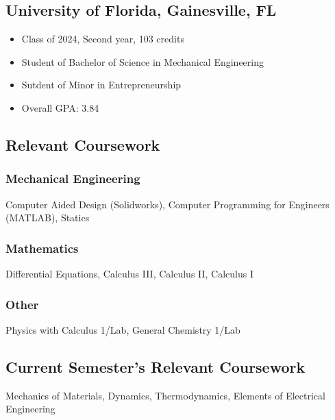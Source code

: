\documentclass{article}
\newcommand\halftextbox[1]{%
  \parbox[t]{.475\textwidth}{#1}%
}
\newcommand\spacetextbox[1]{%
  \parbox{.05\textwidth}{#1}%
}
\newenvironment{CustomItemize}
{ \begin{itemize}[leftmargin=1em]
    \setlength{\itemsep}{0pt}
    \setlength{\parskip}{0pt}
    \setlength{\parindent}{0pt}
    \setlength{\parsep}{0pt}     }
{ \end{itemize}                  }
\begin{document}
\noindent
\halftextbox{
\begin{raggedright}
\subsection{University of Florida,  Gainesville, FL}
\begin{CustomItemize}
\item Class of 2024, Second year, 103 credits
\item Student of Bachelor of Science in Mechanical Engineering
\item Sutdent of Minor in Entrepreneurship
\item Overall GPA: 3.84
\end{CustomItemize}

\subsection{Relevant Coursework}
\subsubsection{Mechanical Engineering}
Computer Aided Design (Solidworks),
Computer Programming for Engineers (MATLAB),
Statics
\end{raggedright}
}
\spacetextbox{\hfil\hfil}
\halftextbox{
\begin{raggedright}
\subsubsection{Mathematics}
Differential Equations, 
Calculus III,
Calculus II,
Calculus I

\subsubsection{Other}
Physics with Calculus 1/Lab, 
General Chemistry 1/Lab

\subsection{Current Semester's Relevant Coursework}
Mechanics of Materials,
Dynamics,
Thermodynamics,
Elements of Electrical Engineering
\end{raggedright}
}
\end{document}
